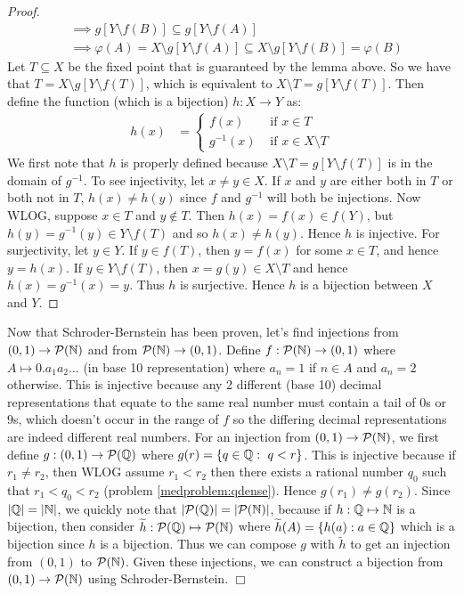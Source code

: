 \documentclass{article}
\begin{document}
{\begin{proof}
\begin{align*}
            &\implies g[Y\setminus f(B)]\subseteq g[Y\setminus f(A)]\\
            &\implies \varphi(A) =X \setminus g[Y\setminus f(A)] \subseteq X\setminus g[Y\setminus f(B)] = \varphi(B)
        \end{align*}
        Let $T\subseteq X$ be the fixed point that is guaranteed by the lemma above. So we have that $T = X\setminus g[Y\setminus f(T)]$, which is equivalent to $X\setminus T = g[Y\setminus f(T)]$. Then define the function (which is a bijection) $h: X\to Y$ as:
        \begin{align*}
            h(x) &= \begin{cases}
                f(x) &\text{ if }x\in T\\
                g^{-1}(x) &\text{ if }x\in X\setminus T
            \end{cases}
        \end{align*}
        We first note that $h$ is properly defined because $X\setminus T = g[Y\setminus f(T)]$ is in the domain of $g^{-1}$. To see injectivity, let $x\neq y\in X$. If $x$ and $y$ are either both in $T$ or both not in $T$, $h(x)\neq h(y)$ since $f$ and $g^{-1}$ will both be injections. Now WLOG, suppose $x\in T$ and $y\not\in T$. Then $h(x) = f(x) \in f(Y)$, but $h(y) = g^{-1}(y) \in Y\setminus f(T)$ and so $h(x)\neq h(y)$. Hence $h$ is injective. For surjectivity, let $y\in Y$. If $y\in f(T)$, then $y = f(x)$ for some $x\in T$, and hence $y = h(x)$. If $y\in Y\setminus f(T)$, then $x = g(y) \in X\setminus T$ and hence $h(x) = g^{-1}(x) = y$. Thus $h$ is surjective. Hence $h$ is a bijection between $X$ and $Y$.
    \end{proof}
    Now that Schroder-Bernstein has been proven, let's find injections from $(0,1)\to \mathcal{P}(\mathbb{N})$ and from $\mathcal{P}(\mathbb{N})\to (0,1)$. Define $f:\mathcal{P}(\mathbb{N})\to (0,1)$ where $A\mapsto 0.a_{1}a_{2}\dots$ (in base 10 representation) where $a_{n} = 1$ if $n\in A$ and $a_{n}=2$ otherwise. This is injective because any 2 different (base 10) decimal representations that equate to the same real number must contain a tail of $0$s or $9$s, which doesn't occur in the range of $f$ so the differing decimal representations are indeed different real numbers. For an injection from $(0,1)\to \mathcal{P}(\mathbb{N})$, we first define $g: (0,1)\to \mathcal{P}(\mathbb{Q})$ where $g(r) = \{q\in \mathbb{Q}:\ q < r\}$. This is injective because if $r_{1}\neq r_{2}$, then WLOG assume $r_{1} < r_{2}$ then there exists a rational number $q_{0}$ such that $r_{1} < q_{0} < r_{2}$ (problem \ref{medproblem:qdense}). Hence $g(r_{1})\neq g(r_{2})$. Since $\lvert \mathbb{Q}\rvert = \lvert \mathbb{N}\rvert$, we quickly note that $\lvert \mathcal{P}(\mathbb{Q})\rvert = \lvert \mathcal{P}(\mathbb{N})\rvert$, because if $h: \mathbb{Q}\mapsto\mathbb{N}$ is a bijection, then consider $\widetilde{h}: \mathcal{P}(\mathbb{Q})\mapsto\mathcal{P}(\mathbb{N})$ where $\widetilde{h}(A) = \{h(a):a\in \mathbb{Q}\}$ which is a bijection since $h$ is a bijection. Thus we can compose $g$ with $\widetilde{h}$ to get an injection from $(0,1)$ to $\mathcal{P}(\mathbb{N})$. Given these injections, we can construct a bijection from $(0,1)\to \mathcal{P}(\mathbb{N})$ using Schroder-Bernstein. $\Box$
}
\end{document}
